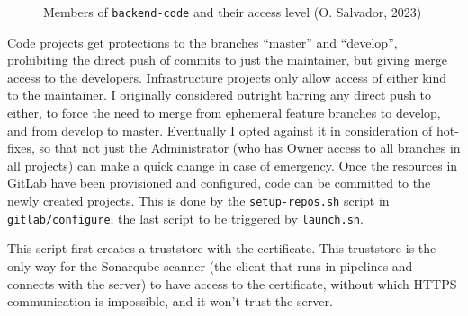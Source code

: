 \documentclass[11pt]{article}
\begin{document}
\begin{flushleft}
        \begin{figure}[htb]
    		\centering
    		\caption{Members of \texttt{backend-code} and their access level (O. Salvador, 2023)}
    	\end{figure}

    Code projects get protections to the branches ``master'' and ``develop'', prohibiting the direct push of commits to just the maintainer, but giving merge access to the developers. Infrastructure projects only allow access of either kind to the maintainer. I originally considered outright barring any direct push to either, to force the need to merge from ephemeral feature branches to develop, and from develop to master. Eventually I opted against it in consideration of hot-fixes, so that not just the Administrator (who has Owner access to all branches in all projects) can make a quick change in case of emergency. Once the resources in GitLab have been provisioned and configured, code can be committed to the newly created projects. This is done by the \texttt{setup-repos.sh} script in \texttt{gitlab/configure}, the last script to be triggered by \texttt{launch.sh}.
    \linebreak

    This script first creates a truststore with the certificate. This truststore is the only way for the Sonarqube scanner (the client that runs in pipelines and connects with the server) to have access to the certificate, without which HTTPS communication is impossible, and it won't trust the server.


\end{flushleft}
\end{document}

